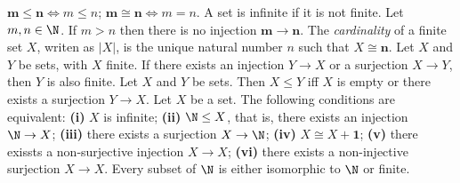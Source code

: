  $\mathbf{m} \leq \mathbf{n} \iff m \leq n$; $\mathbf{m} \cong \mathbf{n} \iff m = n$.
 A set is infinite if it is not finite.
 Let $m, n \in \N$. If $m > n$ then there is no injection $\mathbf{m} \to \mathbf{n}$.
 The \textit{cardinality} of a finite set $X$, writen as $|X|$, is the unique natural number $n$ such that $X \cong \mathbf{n}$.
 Let $X$ and $Y$ be sets, with $X$ finite. If there exists an injection $Y \to X$ or a surjection $X \to Y$, then $Y$ is also finite.
 Let $X$ and $Y$ be sets. Then $X \leq Y$ iff $X$ is empty or there exists a surjection $Y \to X$.
 Let $X$ be a set. The following conditions are equivalent: \textbf{(i)} $X$ is infinite; \textbf{(ii)} $\N \leq X$, that is, there exists an injection $\N \to X$; \textbf{(iii)} there exists a surjection $X \to \N$; \textbf{(iv)} $X \cong X + \mathbf{1}$; \textbf{(v)} there exissts a non-surjective injection $X \to X$; \textbf{(vi)} there exists a non-injective surjection $X \to X$.
 Every subset of $\N$ is either isomorphic to $\N$ or finite.
